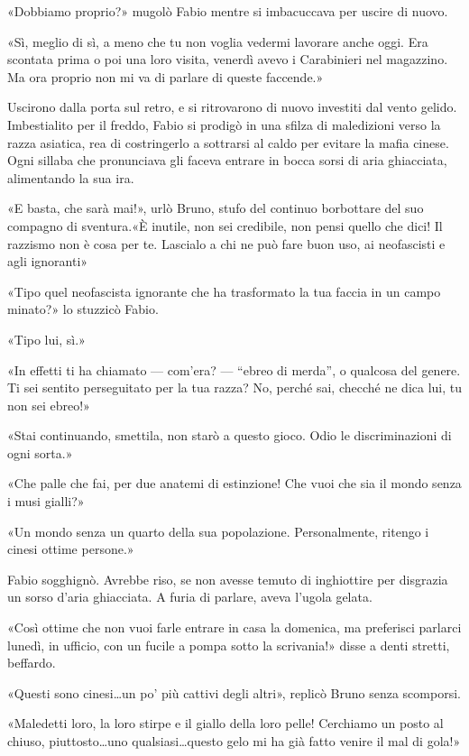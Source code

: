 «Dobbiamo proprio?» mugolò Fabio mentre si imbacuccava per uscire di nuovo.

«Sì, meglio di sì, a meno che tu non voglia vedermi lavorare anche oggi. Era scontata prima o poi una loro visita, venerdì avevo i Carabinieri nel magazzino. Ma ora proprio non mi va di parlare di queste faccende.»

Uscirono dalla porta sul retro, e si ritrovarono di nuovo investiti dal vento gelido. Imbestialito per il freddo, Fabio si prodigò in una sfilza di maledizioni verso la razza asiatica, rea di costringerlo a sottrarsi al caldo per evitare la mafia cinese. Ogni sillaba che pronunciava gli faceva entrare in bocca sorsi di aria ghiacciata, alimentando la sua ira.

«E basta, che sarà mai!», urlò Bruno, stufo del continuo borbottare del suo compagno di sventura.«È inutile, non sei credibile, non pensi quello che dici! Il razzismo non è cosa per te. Lascialo a chi ne può fare buon uso, ai neofascisti e agli ignoranti»

«Tipo quel neofascista ignorante che ha trasformato la tua faccia in un campo minato?» lo stuzzicò Fabio.

«Tipo lui, sì.»

«In effetti ti ha chiamato --- com'era? --- ``ebreo di merda'', o qualcosa del genere. Ti sei sentito perseguitato per la tua razza? No, perché sai, checché ne dica lui, tu non sei ebreo!»

«Stai continuando, smettila, non starò a questo gioco. Odio le discriminazioni di ogni sorta.»

«Che palle che fai, per due anatemi di estinzione! Che vuoi che sia il mondo senza i musi gialli?»

«Un mondo senza un quarto della sua popolazione. Personalmente, ritengo i cinesi ottime persone.»

Fabio sogghignò. Avrebbe riso, se non avesse temuto di inghiottire per disgrazia un sorso d'aria ghiacciata. A furia di parlare, aveva l'ugola gelata.

«Così ottime che non vuoi farle entrare in casa la domenica, ma preferisci parlarci lunedì, in ufficio, con un fucile a pompa sotto la scrivania!» disse a denti stretti, beffardo.

«Questi sono cinesi\ldots un po' più cattivi degli altri», replicò Bruno senza scomporsi.

«Maledetti loro, la loro stirpe e il giallo della loro pelle! Cerchiamo un posto al chiuso, piuttosto\ldots uno qualsiasi\ldots questo gelo mi ha già fatto venire il mal di gola!»

